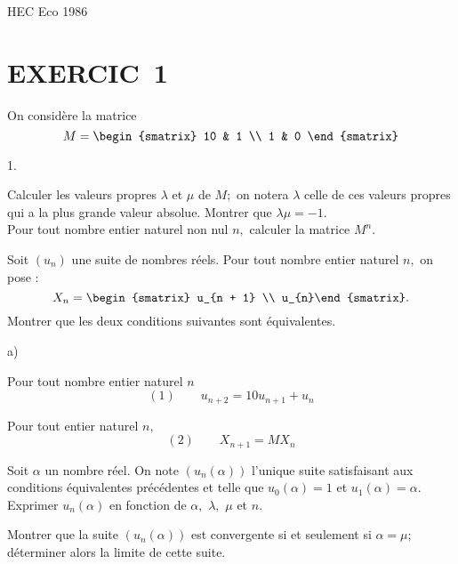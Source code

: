 \documentclass[11pt]{article}%
\begin{document}
\begin{center}
{\huge HEC Eco 1986}
\end{center}

\section*{EXERCIC\E\ 1}

On considère la matrice 
\[
M = 
\begin{smatrix}
10 & 1 \\
1 & 0
\end{smatrix}
\]

\begin{noliste}{1.}
 \setlength{\itemsep}{4mm}
\item Calculer les valeurs propres $\lambda $ et $\mu $ de $M;$ on
notera $\lambda $ celle de ces valeurs propres qui a la plus grande
valeur absolue.
Montrer que $\lambda \mu = -1.$\\
Pour tout nombre entier naturel non nul $n,$ calculer la matrice
$M^{n}.$

\item Soit $(u_{n})$ une suite de nombres réels. Pour tout nombre
entier
naturel $n,$ on pose :
\[
X_{n} = 
\begin{smatrix}
u_{n + 1} \\
u_{n}\end{smatrix}.
\]
Montrer que les deux conditions suivantes sont équivalentes.

\begin{noliste}{a)}
 \setlength{\itemsep}{2mm}
\item Pour tout nombre entier naturel $n$
\[
(1)\qquad u_{n + 2} = 10u_{n + 1} + u_{n}
\]

\item Pour tout entier naturel $n,$ 
\[
(2)\qquad X_{n + 1} = MX_{n}
\]
\end{noliste}

\item Soit $\alpha $ un nombre réel. On note $(u_{n}(\alpha ))$
l'unique
suite satisfaisant aux conditions équivalentes précédentes et telle que
$u_{0}(\alpha ) = 1$ et $u_{1}(\alpha ) = \alpha.$\\
Exprimer $u_{n}(\alpha )$ en fonction de $\alpha,$ $\lambda,$ $\mu $ et
$n.
$

\item Montrer que la suite $(u_{n}(\alpha ))$ est convergente si et
seulement si $\alpha = \mu ;$ déterminer alors la limite de cette
suite.


\end{noliste}
\end{document}
